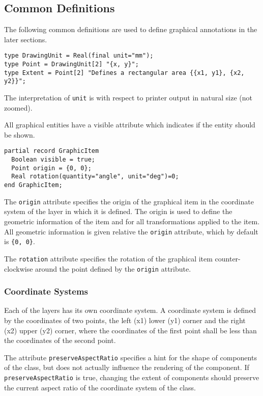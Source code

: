 \subsection{Common Definitions}\label{common-definitions}

The following common definitions are used to define graphical annotations in the later sections.
\begin{lstlisting}[language=modelica]
type DrawingUnit = Real(final unit="mm");
type Point = DrawingUnit[2] "{x, y}";
type Extent = Point[2] "Defines a rectangular area {{x1, y1}, {x2, y2}}";
\end{lstlisting}%
The interpretation of \lstinline!unit! is with respect to printer output in natural size (not zoomed).

All graphical entities have a visible attribute which indicates if the entity should be shown.
\begin{lstlisting}[language=modelica]
partial record GraphicItem
  Boolean visible = true;
  Point origin = {0, 0};
  Real rotation(quantity="angle", unit="deg")=0;
end GraphicItem;
\end{lstlisting}%
The \lstinline!origin! attribute specifies the origin of the graphical item in the coordinate system of the layer in which it is defined.
The origin is used to define the geometric information of the item and for all transformations applied to the item.
All geometric information is given relative the \lstinline!origin! attribute, which by default is \lstinline!{0, 0}!.

The \lstinline!rotation! attribute specifies the rotation of the graphical item
counter-clockwise around the point defined by the \lstinline!origin! attribute.

\subsubsection{Coordinate Systems}\label{coordinate-systems}

Each of the layers has its own coordinate system.
A coordinate system is defined by the coordinates of two points, the left (x1) lower (y1) corner and the right (x2) upper (y2) corner, where the coordinates of the first point shall be less than the coordinates of the second point.

The attribute \lstinline!preserveAspectRatio! specifies a hint for the shape of
components of the class, but does not actually influence the rendering of the component.
If \lstinline!preserveAspectRatio! is true, changing the
extent of components should preserve the current aspect ratio of the coordinate
system of the class.

